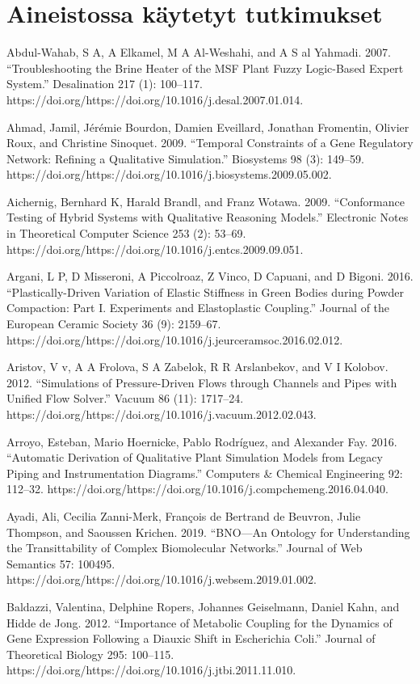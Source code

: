 \documentclass[utf8]{gradu3}
\begin{document}
\section{Aineistossa käytetyt tutkimukset}

Abdul-Wahab, S A, A Elkamel, M A Al-Weshahi, and A S al Yahmadi. 2007. “Troubleshooting the Brine Heater of the MSF Plant Fuzzy Logic-Based Expert System.” Desalination 217 (1): 100–117. https://doi.org/https://doi.org/10.1016/j.desal.2007.01.014.

Ahmad, Jamil, Jérémie Bourdon, Damien Eveillard, Jonathan Fromentin, Olivier Roux, 
and Christine Sinoquet. 2009. 
“Temporal Constraints of a Gene Regulatory Network: 
Refining a Qualitative Simulation.” Biosystems 98 (3): 149–59.
https://doi.org/https://doi.org/10.1016/j.biosystems.2009.05.002.

Aichernig, Bernhard K, Harald Brandl, and Franz Wotawa. 2009. “Conformance Testing of Hybrid Systems with Qualitative Reasoning Models.” Electronic Notes in Theoretical Computer Science 253 (2): 53–69. https://doi.org/https://doi.org/10.1016/j.entcs.2009.09.051.

Argani, L P, D Misseroni, A Piccolroaz, Z Vinco, D Capuani, and D Bigoni. 2016. “Plastically-Driven Variation of Elastic Stiffness in Green Bodies during Powder Compaction: Part I. Experiments and Elastoplastic Coupling.” Journal of the European Ceramic Society 36 (9): 2159–67. https://doi.org/https://doi.org/10.1016/j.jeurceramsoc.2016.02.012.

Aristov, V v, A A Frolova, S A Zabelok, R R Arslanbekov, and V I Kolobov. 2012. “Simulations of Pressure-Driven Flows through Channels and Pipes with Unified Flow Solver.” Vacuum 86 (11): 1717–24. https://doi.org/https://doi.org/10.1016/j.vacuum.2012.02.043.

Arroyo, Esteban, Mario Hoernicke, Pablo Rodríguez, and Alexander Fay. 2016. “Automatic Derivation of Qualitative Plant Simulation Models from Legacy Piping and Instrumentation Diagrams.” Computers \& Chemical Engineering 92: 112–32. https://doi.org/https://doi.org/10.1016/j.compchemeng.2016.04.040.

Ayadi, Ali, Cecilia Zanni-Merk, François de Bertrand de Beuvron, Julie Thompson, and Saoussen Krichen. 2019. “BNO—An Ontology for Understanding the Transittability of Complex Biomolecular Networks.” Journal of Web Semantics 57: 100495. https://doi.org/https://doi.org/10.1016/j.websem.2019.01.002.

Baldazzi, Valentina, Delphine Ropers, Johannes Geiselmann, Daniel Kahn, and Hidde de Jong. 2012. “Importance of Metabolic Coupling for the Dynamics of Gene Expression Following a Diauxic Shift in Escherichia Coli.” Journal of Theoretical Biology 295: 100–115. https://doi.org/https://doi.org/10.1016/j.jtbi.2011.11.010.
\end{document}
